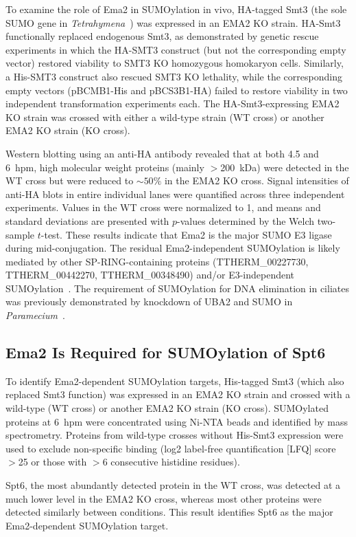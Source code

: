 \documentclass[12pt]{article}
\begin{document}
To examine the role of Ema2 in SUMOylation in vivo, HA-tagged Smt3 (the sole SUMO gene in \textit{Tetrahymena}~\citep{Nasir2015}) was expressed in an EMA2 KO strain.
HA-Smt3 functionally replaced endogenous Smt3, as demonstrated by genetic rescue experiments in which the HA-SMT3 construct (but not the corresponding empty vector) restored viability to SMT3 KO homozygous homokaryon cells.
Similarly, a His-SMT3 construct also rescued SMT3 KO lethality, while the corresponding empty vectors (pBCMB1-His and pBCS3B1-HA) failed to restore viability in two independent transformation experiments each.
The HA-Smt3-expressing EMA2 KO strain was crossed with either a wild-type strain (WT cross) or another EMA2 KO strain (KO cross).

Western blotting using an anti-HA antibody revealed that at both 4.5 and 6~hpm, high molecular weight proteins (mainly $>$200~kDa) were detected in the WT cross but were reduced to ${\sim}50\%$ in the EMA2 KO cross.
Signal intensities of anti-HA blots in entire individual lanes were quantified across three independent experiments.
Values in the WT cross were normalized to 1, and means and standard deviations are presented with $p$-values determined by the Welch two-sample $t$-test.
These results indicate that Ema2 is the major SUMO E3 ligase during mid-conjugation.
The residual Ema2-independent SUMOylation is likely mediated by other SP-RING-containing proteins (TTHERM\_00227730, TTHERM\_00442270, TTHERM\_00348490) and/or E3-independent SUMOylation~\citep{Sampson2001}.
The requirement of SUMOylation for DNA elimination in ciliates was previously demonstrated by knockdown of UBA2 and SUMO in \textit{Paramecium}~\citep{Matsuda2006}.

\subsection{Ema2 Is Required for SUMOylation of Spt6}

To identify Ema2-dependent SUMOylation targets, His-tagged Smt3 (which also replaced Smt3 function) was expressed in an EMA2 KO strain and crossed with a wild-type (WT cross) or another EMA2 KO strain (KO cross).
SUMOylated proteins at 6~hpm were concentrated using Ni-NTA beads and identified by mass spectrometry.
Proteins from wild-type crosses without His-Smt3 expression were used to exclude non-specific binding (log2 label-free quantification [LFQ] score $>$25 or those with $>$6 consecutive histidine residues).

Spt6, the most abundantly detected protein in the WT cross, was detected at a much lower level in the EMA2 KO cross, whereas most other proteins were detected similarly between conditions.
This result identifies Spt6 as the major Ema2-dependent SUMOylation target.
\end{document}
